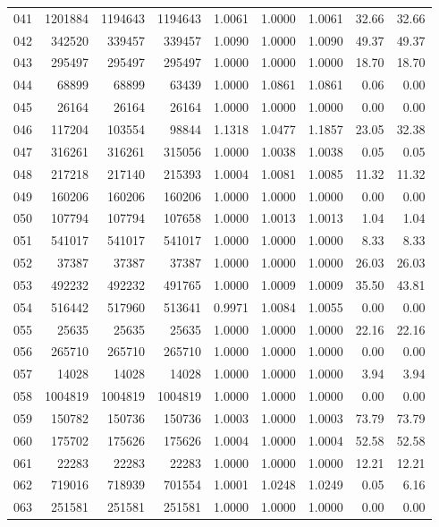 \begin{longtable}{crrrrrrrr}
041 & 1201884 & 1194643 & 1194643 & 1.0061 & 1.0000 & 1.0061 & 32.66 & 32.66 \\
042 & 342520 & 339457 & 339457 & 1.0090 & 1.0000 & 1.0090 & 49.37 & 49.37 \\
043 & 295497 & 295497 & 295497 & 1.0000 & 1.0000 & 1.0000 & 18.70 & 18.70 \\
044 & 68899 & 68899 & 63439 & 1.0000 & 1.0861 & 1.0861 & 0.06 & 0.00 \\
045 & 26164 & 26164 & 26164 & 1.0000 & 1.0000 & 1.0000 & 0.00 & 0.00 \\
046 & 117204 & 103554 & 98844 & 1.1318 & 1.0477 & 1.1857 & 23.05 & 32.38 \\
047 & 316261 & 316261 & 315056 & 1.0000 & 1.0038 & 1.0038 & 0.05 & 0.05 \\
048 & 217218 & 217140 & 215393 & 1.0004 & 1.0081 & 1.0085 & 11.32 & 11.32 \\
049 & 160206 & 160206 & 160206 & 1.0000 & 1.0000 & 1.0000 & 0.00 & 0.00 \\
050 & 107794 & 107794 & 107658 & 1.0000 & 1.0013 & 1.0013 & 1.04 & 1.04 \\
051 & 541017 & 541017 & 541017 & 1.0000 & 1.0000 & 1.0000 & 8.33 & 8.33 \\
052 & 37387 & 37387 & 37387 & 1.0000 & 1.0000 & 1.0000 & 26.03 & 26.03 \\
053 & 492232 & 492232 & 491765 & 1.0000 & 1.0009 & 1.0009 & 35.50 & 43.81 \\
054 & 516442 & 517960 & 513641 & 0.9971 & 1.0084 & 1.0055 & 0.00 & 0.00 \\
055 & 25635 & 25635 & 25635 & 1.0000 & 1.0000 & 1.0000 & 22.16 & 22.16 \\
056 & 265710 & 265710 & 265710 & 1.0000 & 1.0000 & 1.0000 & 0.00 & 0.00 \\
057 & 14028 & 14028 & 14028 & 1.0000 & 1.0000 & 1.0000 & 3.94 & 3.94 \\
058 & 1004819 & 1004819 & 1004819 & 1.0000 & 1.0000 & 1.0000 & 0.00 & 0.00 \\
059 & 150782 & 150736 & 150736 & 1.0003 & 1.0000 & 1.0003 & 73.79 & 73.79 \\
060 & 175702 & 175626 & 175626 & 1.0004 & 1.0000 & 1.0004 & 52.58 & 52.58 \\
061 & 22283 & 22283 & 22283 & 1.0000 & 1.0000 & 1.0000 & 12.21 & 12.21 \\
062 & 719016 & 718939 & 701554 & 1.0001 & 1.0248 & 1.0249 & 0.05 & 6.16 \\
063 & 251581 & 251581 & 251581 & 1.0000 & 1.0000 & 1.0000 & 0.00 & 0.00 \\

\end{longtable}
